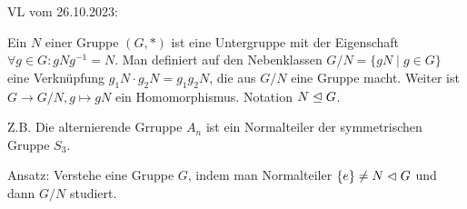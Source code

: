 \documentclass[../main.tex]{subfiles}
\begin{document}
\begin{flushright}
VL vom 26.10.2023:
\end{flushright}
\addtocounter{theorem}{-1}
\begin{reminder}
    Ein  $N$ einer Gruppe $(G,*)$ ist eine Untergruppe mit der Eigenschaft  $\forall g\in G: gNg^{-1} = N$. Man definiert auf den Nebenklassen $G/N = \{gN\mid g\in G\}$ eine Verknüpfung $g_1N \cdot g_2N = g_1g_2N$, die aus $G/N$ eine Gruppe macht. Weiter ist $G\rightarrow G/N, g\mapsto gN$ ein Homomorphismus. Notation $N\trianglelefteq G$.

    Z.B. Die alternierende Grruppe $A_n$ ist ein Normalteiler der symmetrischen Gruppe $S_3$.

\end{reminder}
Ansatz: Verstehe eine Gruppe $G$, indem man Normalteiler $\{e\} \neq N \vartriangleleft G$ und dann $G/N$ studiert.
\end{document}
